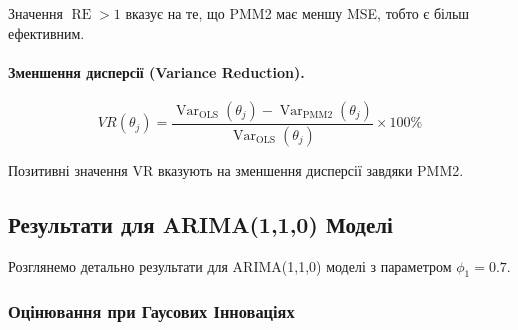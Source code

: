 \documentclass[12pt,a4paper]{article}
\DeclareMathOperator{\Var}{Var}
\DeclareMathOperator{\RE}{RE}
\begin{document}
Значення $\RE > 1$ вказує на те, що PMM2 має меншу MSE, тобто є більш ефективним.

\paragraph{Зменшення дисперсії (Variance Reduction).}
\begin{equation}
\label{eq:variance_reduction}
VR(\theta_j) = \frac{\Var_{\text{OLS}}(\theta_j) - \Var_{\text{PMM2}}(\theta_j)}{\Var_{\text{OLS}}(\theta_j)} \times 100\%
\end{equation}

Позитивні значення VR вказують на зменшення дисперсії завдяки PMM2.

\subsection{Результати для ARIMA(1,1,0) Моделі}
\label{subsec:results_arima110}

Розглянемо детально результати для ARIMA(1,1,0) моделі з параметром $\phi_1 = 0.7$.

\subsubsection{Оцінювання при Гаусових Інноваціях}
\end{document}

